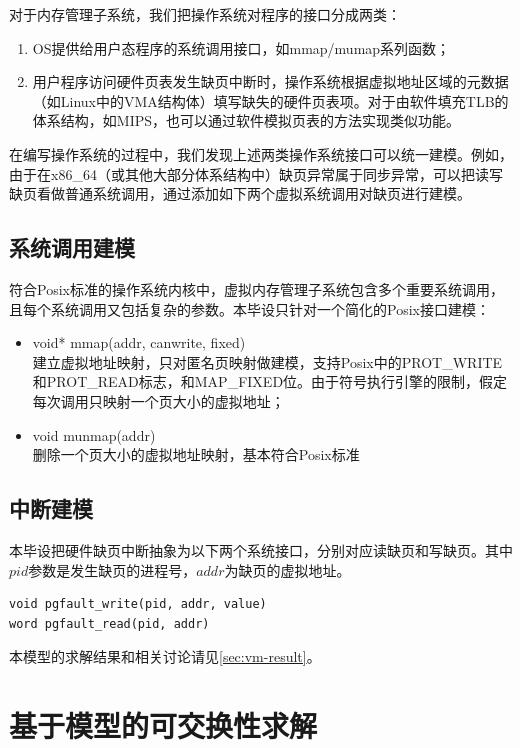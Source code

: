 对于内存管理子系统，我们把操作系统对程序的接口分成两类：
\begin{enumerate}
\item OS提供给用户态程序的系统调用接口，如mmap/mumap系列函数；
\item 用户程序访问硬件页表发生缺页中断时，操作系统根据虚拟地址区域的元数据（如Linux中的VMA结构体）填写缺失的硬件页表项。对于由软件填充TLB的体系结构，如MIPS，也可以通过软件模拟页表的方法实现类似功能。
\end{enumerate}

在编写操作系统的过程中，我们发现上述两类操作系统接口可以统一建模。例如，由于在x86\_64（或其他大部分体系结构中）缺页异常属于同步异常\cite{intelsys}，可以把读写缺页看做普通系统调用，通过添加如下两个虚拟系统调用对缺页进行建模。

\subsection{系统调用建模}
符合Posix标准的操作系统内核中，虚拟内存管理子系统包含多个重要系统调用，且每个系统调用又包括复杂的参数。本毕设只针对一个简化的Posix接口建模：

\begin{itemize}
	\item void* mmap(addr, canwrite, fixed) \\
		建立虚拟地址映射，只对匿名页映射做建模，支持Posix中的PROT\_WRITE和PROT\_READ标志，和MAP\_FIXED位。由于符号执行引擎的限制，假定每次调用只映射一个页大小的虚拟地址；
	\item void munmap(addr) \\
		删除一个页大小的虚拟地址映射，基本符合Posix标准
\end{itemize}

\subsection{中断建模}

本毕设把硬件缺页中断抽象为以下两个系统接口，分别对应读缺页和写缺页。其中$pid$参数是发生缺页的进程号，$addr$为缺页的虚拟地址。

\begin{lstlisting}
void pgfault_write(pid, addr, value)
word pgfault_read(pid, addr)
\end{lstlisting}

本模型的求解结果和相关讨论请见\ref{sec:vm-result}。

\section{基于模型的可交换性求解}

